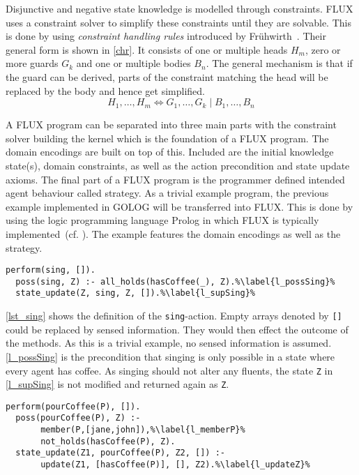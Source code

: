 Disjunctive and negative state knowledge is modelled through constraints.
FLUX uses a constraint solver to simplify these constraints until they are solvable.
This is done by using \emph{constraint handling rules} introduced by Frühwirth~\cite{fruhwirth_theory_1998}.
Their general form is shown in \autoref{chr}.
It consists of one or multiple heads $H_m$, zero or more guards $G_k$ and one or multiple bodies $B_n$.
The general mechanism is that if the guard can be derived, parts of the constraint matching the head will be replaced by the body and hence get simplified.
\begin{equation}\label{chr}
  H_1,\ldots,H_m\Leftrightarrow G_1,\ldots,G_k \mid B_1,\ldots,B_n
\end{equation}

A FLUX program can be separated into three main parts with the constraint solver building the kernel which is the foundation of a FLUX program.
The domain encodings are built on top of this.
Included are the initial knowledge state(s), domain constraints, as well as the action precondition and state update axioms.
The final part of a FLUX program is the programmer defined intended agent behaviour called strategy.
As a trivial example program, the previous example implemented in GOLOG will be transferred into FLUX.
This is done by using the logic programming language Prolog in which FLUX is typically implemented~(cf. \cite{thielscher_reasoning_2006,martin_addressing_2001}). %
The example features the domain encodings as well as the strategy.
\begin{lstlisting}[caption={Defintion of the \texttt{sing}-action.}, label=lst_sing]
  perform(sing, []).
  poss(sing, Z) :- all_holds(hasCoffee(_), Z).%\label{l_possSing}%
  state_update(Z, sing, Z, []).%\label{l_supSing}%
\end{lstlisting}
\autoref{lst_sing} shows the definition of the \texttt{sing}-action.
Empty arrays denoted by \texttt{[]} could be replaced by sensed information.
They would then effect the outcome of the methods.
As this is a trivial example, no sensed information is assumed.
\autoref{l_possSing} is the precondition that singing is only possible in a state where every agent has coffee.
As singing should not alter any fluents, the state \texttt{Z} in \autoref{l_supSing} is not modified and returned again as \texttt{Z}.
\begin{lstlisting}[firstnumber=4, caption={Definition of the \texttt{pourCoffee}-action}, label=lst_pourCoffee]
  perform(pourCoffee(P), []).
  poss(pourCoffee(P), Z) :-
       member(P,[jane,john]),%\label{l_memberP}%
       not_holds(hasCoffee(P), Z).
  state_update(Z1, pourCoffee(P), Z2, []) :-
       update(Z1, [hasCoffee(P)], [], Z2).%\label{l_updateZ}%
\end{lstlisting}
